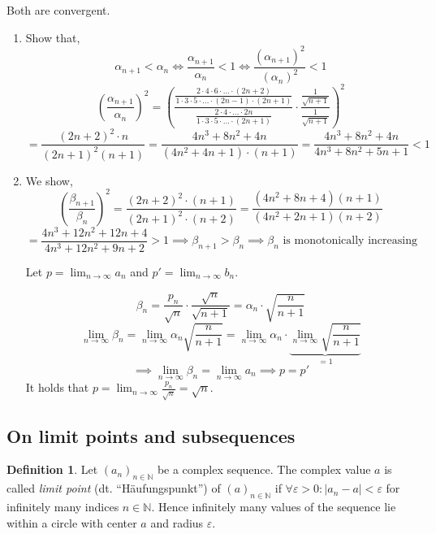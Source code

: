 \documentclass[a4paper,landscape,twocolumn]{article}
\theoremstyle{definition}
\newtheorem{defi}{Definition}
\newcommand\abs[1]{\left|#1\right|}
\newcommand\seq[1]{{\left(#1\right)}_{n \in \mathbb N}}
\begin{document}
Both are convergent.

\begin{enumerate}
  \item Show that,
    \[
        \alpha_{n+1} < \alpha_n \iff
        \frac{\alpha_{n+1}}{\alpha_n} < 1 \iff
        \frac{(\alpha_{n+1})^2}{(\alpha_n)^2} < 1
    \] \[
        \left(\frac{\alpha_{n+1}}{\alpha_n}\right)^2 = \left(
            \frac{\frac{2 \cdot 4 \cdot 6 \cdot \ldots \cdot (2n+2)}{1 \cdot 3 \cdot 5 \cdot \ldots \cdot (2n-1) \cdot (2n+1)}}%
            {\frac{2\cdot4\cdot \ldots \cdot 2n}{1 \cdot 3 \cdot 5 \cdot \ldots \cdot (2n+1)}}
            \cdot \frac{\frac{1}{\sqrt{n+1}}}{\frac{1}{\sqrt{n+1}}}
        \right)^2
    \] \[
        = \frac{(2n+2)^2 \cdot n}{(2n+1)^2 (n + 1)}
        = \frac{4n^3+8n^2+4n}{(4n^2 + 4n + 1)\cdot(n+1)}
        = \frac{4n^3+8n^2+4n}{4n^3+8n^2+5n+1}
        < 1
    \]
  \item We show,
    \[
        \left(\frac{\beta_{n+1}}{\beta_n}\right)^2
        = \frac{(2n+2)^2 \cdot (n+1)}{(2n+1)^2 \cdot (n+2)}
        = \frac{(4n^2 + 8n + 4) (n+1)}{(4n^2+2n+1) (n+2)}
    \] \[
        = \frac{4n^3+12n^2+12n+4}{4n^3 + 12n^2 + 9n + 2}
        > 1 \implies \beta_{n+1} > \beta_n \implies \beta_n \text{ is monotonically increasing}
    \]

    Let $p = \lim_{n\to\infty} a_n$ and $p' = \lim_{n\to\infty} b_n$.

    \[ \beta_n = \frac{p_n}{\sqrt{n}} \cdot \frac{\sqrt{n}}{\sqrt{n+1}} = \alpha_n \cdot \sqrt{\frac{n}{n+1}} \]
    \[ \lim_{n\to\infty} \beta_n = \lim_{n\to\infty} \alpha_n \sqrt{\frac{n}{n+1}} = \lim_{n\to\infty} \alpha_n \cdot \underbrace{\lim_{n\to\infty} \sqrt{\frac{n}{n+1}}}_{=1} \]
    \[ \implies \lim_{n\to\infty} \beta_n = \lim_{n\to\infty} a_n \implies p = p' \]
    It holds that $p = \lim_{n\to\infty} \frac{p_n}{\sqrt{n}} = \sqrt{n}$.
\end{enumerate}

\subsection{On limit points and subsequences}
%
\begin{defi}
  Let $\seq{a_n}$ be a complex sequence.
  The complex value $a$ is called \emph{limit point} (dt. \enquote{\foreignlanguage{ngerman}{Häufungspunkt}})
  of $\seq{a}$ if $\forall \varepsilon > 0: \abs{a_n - a} < \varepsilon$ for infinitely many indices $n \in \mathbb N$.
  Hence infinitely many values of the sequence lie within a circle with center $a$ and radius $\varepsilon$.
\end{defi}
\end{document}
